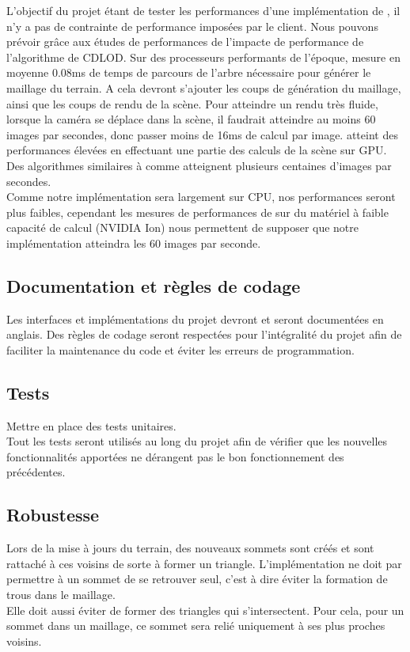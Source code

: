 \documentclass[12pt]{report}
\begin{document}
L'objectif du projet étant de tester les performances d'une
implémentation de \cite{CDLOD}, il n'y a pas de contrainte de
performance imposées par le client. Nous pouvons prévoir grâce aux
études de performances de \cite{CDLOD} l'impacte de performance de
l'algorithme de CDLOD. Sur des processeurs performants de l'époque,
\cite{CDLOD} mesure en moyenne 0.08ms de temps de parcours de l'arbre
nécessaire pour générer le maillage du terrain. A cela devront s'ajouter
les coups de génération du maillage, ainsi que les coups de rendu de la
scène.  Pour atteindre un rendu très fluide, lorsque la caméra se
déplace dans la scène, il faudrait atteindre au moins 60 images par
secondes, donc passer moins de 16ms de calcul par image. \cite{CDLOD}
atteint des performances élevées en effectuant une partie des calculs de
la scène sur GPU.  Des algorithmes similaires à \cite{CDLOD} comme
\cite{PlanetRenderer} atteignent plusieurs centaines d'images par
secondes.\\
Comme notre implémentation sera largement sur CPU, nos
performances seront plus faibles, cependant les mesures de performances
de \cite{CDLOD} sur du matériel à faible capacité de calcul (NVIDIA Ion)
nous permettent de supposer que notre implémentation atteindra les 60
images par seconde.

\newpage

\subsection{Documentation et règles de codage}

Les interfaces et implémentations du projet devront et seront documentées en anglais. Des règles de codage seront respectées pour l'intégralité du projet afin de faciliter la maintenance du code et éviter les erreurs de programmation.



\subsection{Tests}

Mettre en place des tests unitaires.\\
Tout les tests seront utilisés au long du projet afin de vérifier que
les nouvelles fonctionnalités apportées ne dérangent pas le bon
fonctionnement des précédentes.

\subsection{Robustesse}
Lors de la mise à jours du terrain, des nouveaux sommets sont créés et
sont rattaché à ces voisins de sorte à former un triangle.
L'implémentation ne doit par permettre à un sommet de se retrouver seul,
c'est à dire éviter la formation de trous dans le maillage.\\
Elle doit aussi éviter de former des triangles qui s'intersectent.  Pour
cela, pour un sommet dans un maillage, ce sommet sera relié uniquement à
ses plus proches voisins.
\end{document}
